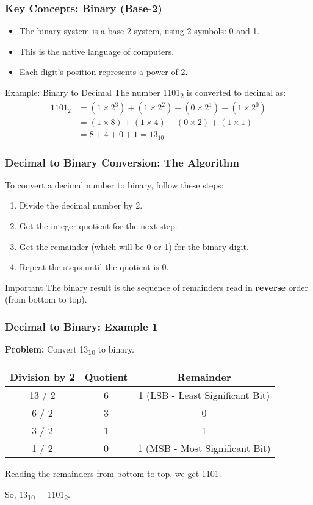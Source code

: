\documentclass{beamer}
\begin{document}
\begin{frame}
\frametitle{Key Concepts: Binary (Base-2)}
\begin{itemize}
    \item The binary system is a base-2 system, using 2 symbols: 0 and 1.
    \item This is the native language of computers.
    \item Each digit's position represents a power of 2.
\end{itemize}
\begin{exampleblock}{Example: Binary to Decimal}
The number 1101\textsubscript{2} is converted to decimal as:
\begin{align*}
    1101_{2} &= (1 \times 2^3) + (1 \times 2^2) + (0 \times 2^1) + (1 \times 2^0) \\
             &= (1 \times 8) + (1 \times 4) + (0 \times 2) + (1 \times 1) \\
             &= 8 + 4 + 0 + 1 = 13_{10}
\end{align*}
\end{exampleblock}
\end{frame}

\begin{frame}
\frametitle{Decimal to Binary Conversion: The Algorithm}
To convert a decimal number to binary, follow these steps:
\begin{enumerate}
    \item Divide the decimal number by 2.
    \item Get the integer quotient for the next step.
    \item Get the remainder (which will be 0 or 1) for the binary digit.
    \item Repeat the steps until the quotient is 0.
\end{enumerate}
\vfill
\begin{alertblock}{Important}
The binary result is the sequence of remainders read in \textbf{reverse} order (from bottom to top).
\end{alertblock}
\end{frame}

\begin{frame}
\frametitle{Decimal to Binary: Example 1}
\textbf{Problem:} Convert 13\textsubscript{10} to binary.

\begin{center}
\begin{tabular}{c|c|c}
\textbf{Division by 2} & \textbf{Quotient} & \textbf{Remainder} \\
\hline
13 / 2 & 6 & \alert{1} (LSB - Least Significant Bit) \\
6 / 2  & 3 & \alert{0} \\
3 / 2  & 1 & \alert{1} \\
1 / 2  & 0 & \alert{1} (MSB - Most Significant Bit) \\
\end{tabular}
\end{center}
\vfill
Reading the remainders from bottom to top, we get \alert{1101}.

\vfill
So, 13\textsubscript{10} = 1101\textsubscript{2}.
\end{frame}
\end{document}
